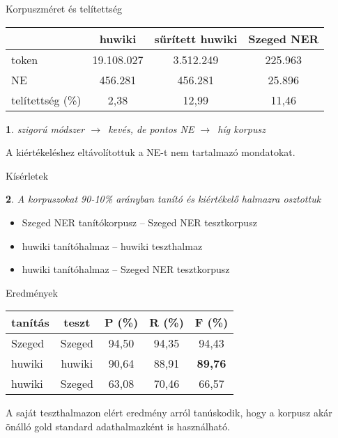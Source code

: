 \documentclass[utf8x,t]{beamer}
\newcommand{\nyil}{$\rightarrow$\ }
\newtheorem{nix}{}[section]
\begin{document}
\begin{frame}{Korpuszméret és telítettség}

\bigskip

\begin{tabular}{lccc}
\toprule
 & \textbf{huwiki} & \textbf{sűrített huwiki} & \textbf{Szeged NER} \\
\midrule
token & 19.108.027 & 3.512.249  & 225.963 \\
NE & 456.281 & 456.281  & 25.896 \\
telítettség (\%) & 2,38 & 12,99 & 11,46 \\
\bottomrule
\end{tabular}

\bigskip

\begin{nix}
szigorú módszer \nyil kevés, de pontos NE \nyil híg korpusz
\end{nix}

\bigskip

A kiértékeléshez eltávolítottuk a NE-t nem tartalmazó mondatokat.

\end{frame}

\begin{frame}{Kísérletek}

\begin{nix}
A korpuszokat 90-10\% arányban tanító és kiértékelő halmazra osztottuk
\end{nix}

\bigskip

\begin{itemize}
\item Szeged NER tanítókorpusz -- Szeged NER tesztkorpusz
\item huwiki tanítóhalmaz -- huwiki teszthalmaz
\item huwiki tanítóhalmaz -- Szeged NER tesztkorpusz
\end{itemize}

\end{frame}

\begin{frame}{Eredmények}

\begin{center}
\begin{tabular}{lcccc}
\toprule 
\bf tanítás & \bf teszt & \bf P (\%) & \bf R (\%) & \bf F (\%) \\ 
\midrule
Szeged & Szeged & 94,50 & 94,35 & 94,43 \\
huwiki & huwiki & 90,64 & 88,91 &  \textbf{89,76}  \\
huwiki & Szeged & 63,08 & 70,46 & 66,57  \\
\bottomrule
\end{tabular}
\end{center}

\bigskip

A saját teszthalmazon elért eredmény arról tanúskodik, hogy a korpusz akár önálló gold standard adathalmazként is használható.

\end{frame}
\end{document}
